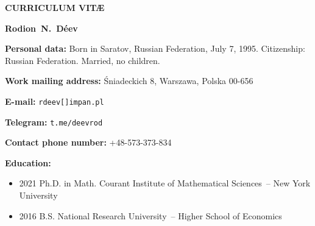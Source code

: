 \documentclass{article}
\begin{document}
\centerline{\bf\large CURRICULUM VIT\AE}

\vspace{3mm}

\centerline{\bf Rodion~N.~D\'eev}

\begin{description}

\vspace{1mm}

\item {\bf Personal data:}  Born in Saratov, Russian Federation, July 7, 1995. 
Citizenship: Russian Federation. Married,  no children.
\vspace{1mm}

\item {\bf Work mailing address:} \'Sniadeckich 8,  Warszawa,  Polska 00-656
\vspace{1mm}


\item {\bf E-mail:} {\tt rdeev[]impan.pl}
\vspace{1mm}

\item {\bf Telegram:} {\tt t.me/deevrod}
\vspace{1mm}

\item {\bf Contact phone number:} +48-573-373-834
\vspace{1mm}

\item {\bf Education:} \begin{itemize}
     \item 2021 \hspace{2mm} Ph.D. in Math. \hspace{2mm} Courant
     Institute of Mathematical Sciences~-- New York University
     \item 2016 \hspace{2mm} B.S. \hspace{2mm} National Research
     University~-- Higher School of Economics
\end{itemize}
\vspace{1mm}


\end{description}
\end{document}
